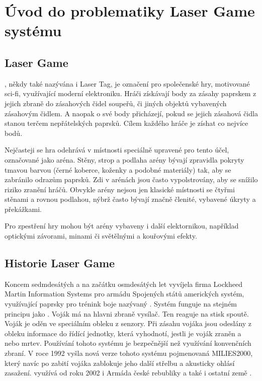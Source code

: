 \section{Úvod do problematiky Laser Game systému}

\subsection{Laser Game}
, někdy také nazývána i Laser Tag, je označení pro společenské hry, motivované sci-fi, využívající moderní elektroniku. Hráči získávají body za zásahy  paprskem z jejich zbraně do zásahových čidel soupeřů, či jiných objektů vybavených zásahovým čidlem. A naopak o své body přicházejí, pokud se jejich zásahová čidla stanou terčem nepřátelských  paprsků. Cílem každého hráče je zíshat co nejvíce bodů.

Nejčasteji se hra odehrává v místnosti speciálně upravené pro tento účel, označované jako aréna. Stěny, strop a podlaha arény bývají zpravidla pokryty tmavou barvou (černé koberce, koženky a podobné materiály) tak, aby se zabránilo odrazům  paprsků. Zdi v arénách jsou často vypolstrovány, aby se snížilo riziko zranění hráčů. Obvykle arény nejsou jen klasické místnosti se čtyřmi stěnami a rovnou podlahou, nýbrž často bývají značně členité, vybavené úkryty a překážkami.

Pro zpestření hry mohou být arény vybaveny i další elektornikou, například optickými závorami, minami či světělnými a kouřovými efekty.



\subsection{Historie Laser Game}
Koncem sedmdesátých a na začátku osmdesátých let vyvíjela firma Lockheed Martin Information Systems pro armádu Spojených států amerických systém, využívající  paprsky pro trénink boje nazývaný . Systém funguje na stejném principu jako . Voják má na hlavni zbraně  vysílač. Ten reaguje na stisk spoutě. Voják je oděn ve speciálním obleku z  senzory. Při zásahu vojáka jsou odeslány z obleku informace do řídící jednotky, která vyhodnotí, jestli je voják zraněn a nebo mrtev. Používání tohoto systému je bezpečnější než využívání konvenčních zbraní. V roce 1992 vyšla nová verze tohoto systému pojmenovaná MILIES2000, který navíc po zabití vojáka zablokuje jeho další střelbu a akusticky ohlásí zasažení.  využívá od roku 2002 i Armáda české rebubliky a také i ostatní země .


